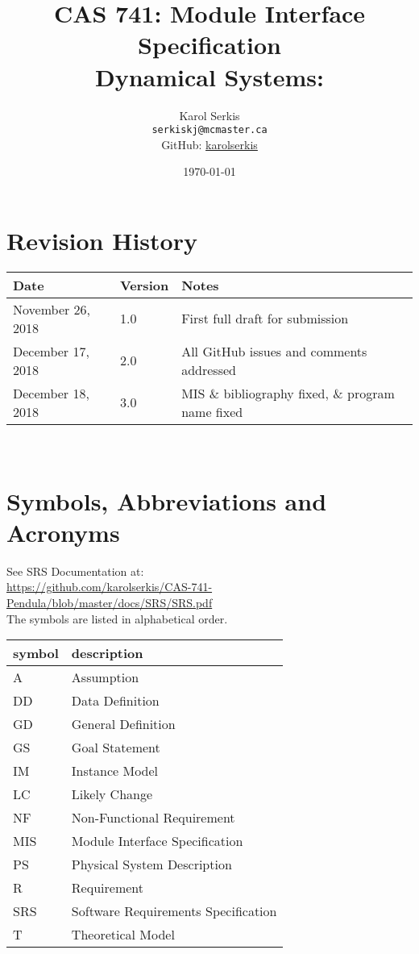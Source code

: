 \documentclass[12pt, titlepage]{article}
\begin{document}
\title{CAS 741: Module Interface Specification\\[10pt]\Large Dynamical 
Systems: \progname}
\author{Karol Serkis\\\texttt{serkiskj@mcmaster.ca}\\GitHub:
\href{https://www.github.com/karolserkis}{karolserkis}}
\date{\today}

\maketitle


\section{Revision History}

\begin{tabularx}{\textwidth}{p{4cm}p{2cm}X}
\toprule {\bf Date} & {\bf Version} & {\bf Notes}\\
\midrule
November 26, 2018 & 1.0 &  First full draft for submission\\
December 17, 2018 & 2.0 & All GitHub issues and comments addressed \\
December 18, 2018 & 3.0 & MIS \& bibliography fixed, 
\& program name fixed \\
\bottomrule
\end{tabularx}

~\newpage

\section{Symbols, Abbreviations and Acronyms}

See SRS Documentation at:\\
\url{https://github.com/karolserkis/CAS-741-Pendula/blob/master/docs/SRS/SRS.pdf}\\
The symbols are listed in alphabetical order.\\

\renewcommand{\arraystretch}{1.2}
\begin{tabular}{l l} 
  \toprule		
  \textbf{symbol} & \textbf{description}\\
  \midrule 
  A & Assumption\\
  DD & Data Definition\\
  GD & General Definition\\
  GS & Goal Statement\\
  IM & Instance Model\\
  LC & Likely Change\\
  NF & Non-Functional Requirement\\
  MIS & Module Interface Specification\\
  PS & Physical System Description\\
  R & Requirement\\
  SRS & Software Requirements Specification\\
  T & Theoretical Model\\
  \bottomrule
\end{tabular}\\
\end{document}
